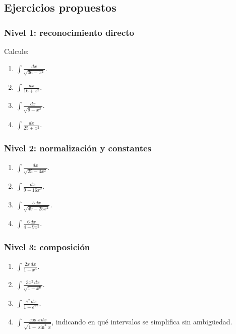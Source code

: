 \subsection{Ejercicios propuestos}

\subsubsection*{Nivel 1: reconocimiento directo}
Calcule:
\begin{enumerate}[label=\arabic*.]
\item $\displaystyle \int\frac{dx}{\sqrt{36-x^2}}$.
\item $\displaystyle \int\frac{dx}{16+x^2}$.
\item $\displaystyle \int\frac{dx}{\sqrt{9-x^2}}$.
\item $\displaystyle \int\frac{dx}{25+x^2}$.
\end{enumerate}

\subsubsection*{Nivel 2: normalización y constantes}
\begin{enumerate}[label=\arabic*.,resume]
\item $\displaystyle \int\frac{dx}{\sqrt{25-4x^2}}$.
\item $\displaystyle \int\frac{dx}{9+16x^2}$.
\item $\displaystyle \int\frac{5\,dx}{\sqrt{49-25x^2}}$.
\item $\displaystyle \int\frac{6\,dx}{4+9x^2}$.
\end{enumerate}

\subsubsection*{Nivel 3: composición}
\begin{enumerate}[label=\arabic*.,resume]
\item $\displaystyle \int\frac{2x\,dx}{1+x^4}$.
\item $\displaystyle \int\frac{3x^2\,dx}{\sqrt{1-x^6}}$.
\item $\displaystyle \int\frac{e^x\,dx}{1+e^{2x}}$.
\item $\displaystyle \int\frac{\cos x\,dx}{\sqrt{1-\sin^2x}}$, indicando en qué intervalos se simplifica sin ambigüedad.
\end{enumerate}

